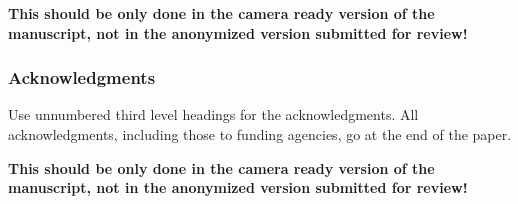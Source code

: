 \documentclass{article} %
\begin{document}
\textbf{This should be only done in the camera ready version of the manuscript, not in the anonymized version submitted for review!}

\subsubsection*{Acknowledgments}
Use unnumbered third level headings for the acknowledgments. All
acknowledgments, including those to funding agencies, go at the end of the paper.

\textbf{This should be only done in the camera ready version of the manuscript, not in the anonymized version submitted for review!}
\end{document}
